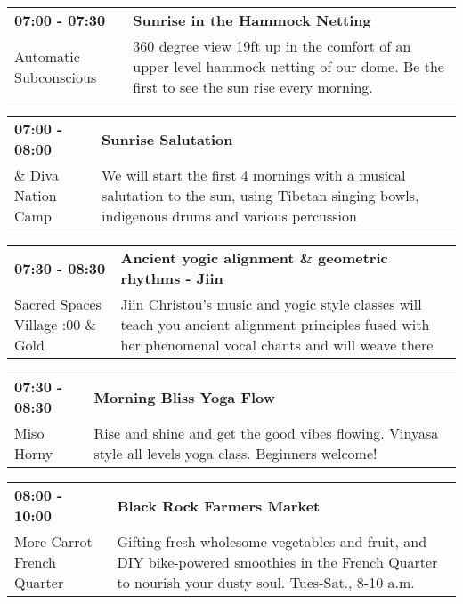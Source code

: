 \begin{tabular}{ p{1in} p{2.2in} }
    \textbf{07:00 - 07:30} & \textbf{Sunrise in the Hammock Netting} \\
    Automatic Subconscious \newline  & 360 degree view 19ft up in the comfort of an upper level hammock netting of our dome. Be the first to see the sun rise every morning. \\
    \hline 
\end{tabular}
    
\begin{tabular}{ p{1in} p{2.2in} }
    \textbf{07:00 - 08:00} & \textbf{Sunrise Salutation} \\
    \& \newline Diva Nation Camp & We will start the first 4 mornings with a musical salutation to the sun, using Tibetan singing bowls, indigenous drums and various percussion \\
    \hline 
\end{tabular}
    
\begin{tabular}{ p{1in} p{2.2in} }
    \textbf{07:30 - 08:30} & \textbf{Ancient yogic alignment \& geometric rhythms - Jiin} \\
    Sacred Spaces Village \newline 4:00 \& Gold & Jiin Christou's  music and yogic style classes will teach you ancient alignment principles fused with her phenomenal vocal chants and will weave there \\
    \hline 
\end{tabular}
    
\begin{tabular}{ p{1in} p{2.2in} }
    \textbf{07:30 - 08:30} & \textbf{Morning Bliss Yoga Flow} \\
    Miso Horny \newline  & Rise and shine and get the good vibes flowing. Vinyasa style all levels yoga class. Beginners welcome! \\
    \hline 
\end{tabular}
    
\begin{tabular}{ p{1in} p{2.2in} }
    \textbf{08:00 - 10:00} & \textbf{Black Rock Farmers Market} \\
    More Carrot \newline French Quarter & Gifting fresh wholesome vegetables and fruit, and DIY bike-powered smoothies in the French Quarter to nourish your dusty soul. Tues-Sat., 8-10 a.m. \\
    \hline 
\end{tabular}
    
